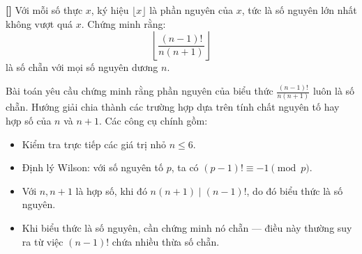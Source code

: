 \documentclass[../05-modular-arithmetic-a.tex]{subfiles}
\begin{document}
\begin{example*}\label{example:THA-2015-MO-P5}\textbf{[]}
    Với mỗi số thực \( x \), ký hiệu \( \lfloor x \rfloor \) là phần nguyên của \( x \), tức là số nguyên lớn nhất không vượt quá \( x \).
    Chứng minh rằng:
    \[
        \left\lfloor \frac{(n - 1)!}{n(n + 1)} \right\rfloor
    \]
    là số chẵn với mọi số nguyên dương \( n \).    
\end{example*}

\begin{story*}
    Bài toán yêu cầu chứng minh rằng phần nguyên của biểu thức \( \frac{(n - 1)!}{n(n + 1)} \) luôn là số chẵn.  
    Hướng giải chia thành các trường hợp dựa trên tính chất nguyên tố hay hợp số của \( n \) và \( n + 1 \). Các công cụ chính gồm:
    \begin{itemize}[topsep=0pt, partopsep=0pt, itemsep=0pt]
        \item Kiểm tra trực tiếp các giá trị nhỏ \( n \le 6 \).
        \item Định lý Wilson: với số nguyên tố \( p \), ta có \( (p - 1)! \equiv -1 \pmod{p} \).
        \item Với \( n, n + 1 \) là hợp số, khi đó \( n(n+1) \mid (n - 1)! \), do đó biểu thức là số nguyên.
        \item Khi biểu thức là số nguyên, cần chứng minh nó chẵn — điều này thường suy ra từ việc \( (n-1)! \) chứa nhiều thừa số chẵn.
    \end{itemize}
\end{story*}

\bigbreak
\end{document}
